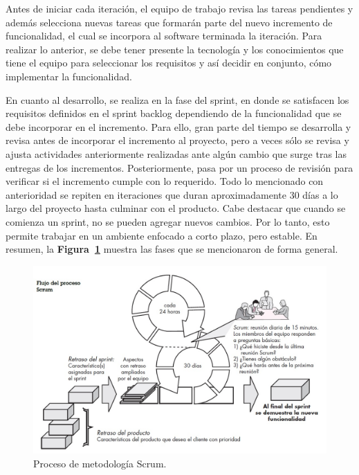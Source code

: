 Antes de iniciar cada iteración, el equipo de trabajo revisa las tareas pendientes y además selecciona nuevas tareas que formarán parte del nuevo incremento de funcionalidad, el cual se incorpora al software terminada la iteración. Para realizar lo anterior, se debe tener presente la tecnología y los conocimientos que tiene el equipo para seleccionar los requisitos y así decidir en conjunto, cómo implementar la funcionalidad.

En cuanto al desarrollo, se realiza en la fase del sprint, en donde se satisfacen los requisitos definidos en el sprint backlog dependiendo de la funcionalidad que se debe incorporar en el incremento. Para ello, gran parte del tiempo se desarrolla y revisa antes de incorporar el incremento al proyecto, pero a veces sólo se revisa y ajusta actividades anteriormente realizadas ante algún cambio que surge tras las entregas de los incrementos. Posteriormente, pasa por un proceso de revisión para verificar si el incremento cumple con lo requerido. Todo lo mencionado con anterioridad se repiten en iteraciones que duran aproximadamente 30 días a lo largo del proyecto hasta culminar con el producto. Cabe destacar que cuando se comienza un sprint, no se pueden agregar nuevos cambios. Por lo tanto, esto permite trabajar en un ambiente enfocado a corto plazo, pero estable. En resumen, la \textbf{Figura~\ref{fig: procesoScrum}} muestra las fases que se mencionaron de forma general.

\begin{figure}[h!]
    \includegraphics[width=\textwidth]{Imagenes/Scrum.jpg}
    \caption{\label{fig: procesoScrum} Proceso de metodología Scrum.}
\end{figure}